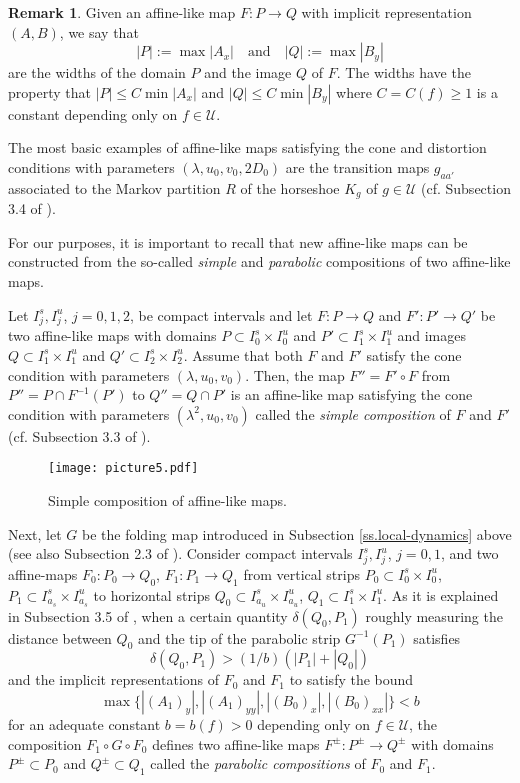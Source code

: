 \documentclass[12pt]{amsart}
\numberwithin{equation}{section}
\theoremstyle{definition}
\newtheorem{remark}[theorem]{Remark}
\newcommand{\<}{{\langle}}
\renewcommand{\>}{{\rangle}}
\begin{document}
\begin{remark}\label{r.width-def.} Given an affine-like map $F:P\to Q$ with implicit representation $(A,B)$, we say that 
$$|P|:=\max|A_x| \quad \textrm{and} \quad |Q|:=\max|B_y|$$
are the widths of the domain $P$ and the image $Q$ of $F$. The widths have the property that $|P|\leq C\min|A_x|$ and $|Q|\leq C\min|B_y|$ where $C=C(f)\geq1$ is a constant depending only on $f\in\mathcal{U}$.
\end{remark}

The most basic examples of affine-like maps satisfying the cone and distortion conditions with parameters $(\lambda, u_0,v_0,2D_0)$ are the transition maps $g_{aa'}$ associated to the Markov partition $R$ of the horseshoe $K_g$ of $g\in\mathcal{U}$ (cf. Subsection 3.4 of \cite{PY09}). 

For our purposes, it is important to recall that new affine-like maps can be constructed from the so-called \emph{simple} and \emph{parabolic} compositions of two affine-like maps. 

Let $I_j^s, I_j^u$, $j=0,1,2$, be compact intervals and let $F:P\to Q$ and $F':P'\to Q'$ be two affine-like maps with domains $P\subset I_0^s\times I_0^u$ and 
$P'\subset I_1^s\times I_1^u$ and images $Q\subset I_1^s\times I_1^u$ and $Q'\subset I_2^s\times I_2^u$. Assume that both $F$ and $F'$ satisfy the cone condition with parameters $(\lambda, u_0, v_0)$. Then, the map $F''=F'\circ F$ from $P''=P\cap F^{-1}(P')$ to $Q''=Q\cap P'$ is an affine-like map satisfying the cone condition with parameters $(\lambda^2, u_0, v_0)$ called the \emph{simple composition} of $F$ and $F'$ (cf. Subsection 3.3 of \cite{PY09}). 

\begin{figure}[htb!]
\texttt{[image: picture5.pdf]}
\caption{Simple composition of affine-like maps.}
\end{figure}

Next, let $G$ be the folding map introduced in Subsection \ref{ss.local-dynamics} above (see also Subsection 2.3 of \cite{PY09}). Consider compact intervals $I_j^s, I_j^u$, $j=0,1$, and two affine-maps $F_0:P_0\to Q_0$, $F_1:P_1\to Q_1$ from vertical strips $P_0\subset I_0^s\times I_0^u$, $P_1\subset I_{a_s}^s\times I_{a_s}^u$ to horizontal strips $Q_0\subset I_{a_u}^s\times I_{a_u}^u$, $Q_1\subset I_1^s\times I_1^u$. As it is explained in Subsection 3.5 of \cite{PY09}, when a certain quantity $\delta(Q_0, P_1)$ roughly measuring the distance between $Q_0$ and the tip of the parabolic strip $G^{-1}(P_1)$ satisfies 
$$\delta(Q_0, P_1)>(1/b)(|P_1|+|Q_0|)$$
and the implicit representations of $F_0$ and $F_1$ to satisfy the bound $$\max\{|(A_1)_y|, |(A_1)_{yy}|, |(B_0)_x|, |(B_0)_{xx}|\}<b$$
for an adequate constant $b=b(f)>0$ depending only on $f\in\mathcal{U}$, the composition $F_1\circ G\circ F_0$ defines two affine-like maps $F^{\pm}:P^{\pm}\to Q^{\pm}$ with domains $P^{\pm}\subset P_0$ and $Q^{\pm}\subset Q_1$ called the \emph{parabolic compositions} of $F_0$ and $F_1$.
\end{document}
